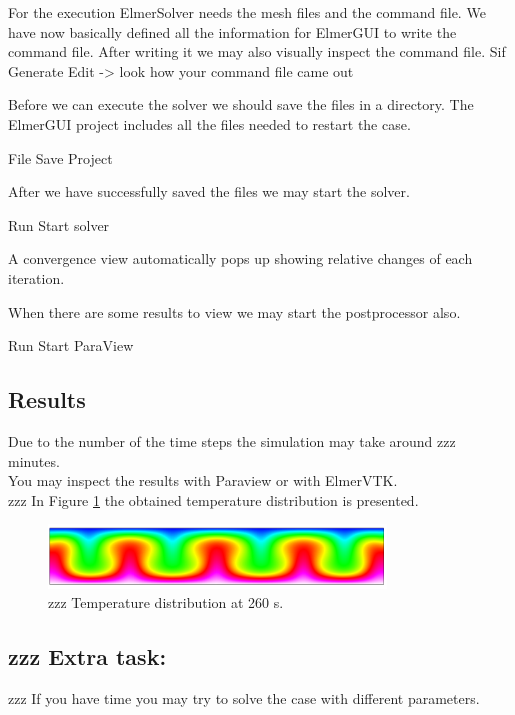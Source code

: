 For the execution ElmerSolver needs the mesh files and the command file.  We have now basically defined all the information for ElmerGUI to write the command file. After writing it we may also visually inspect the command file.
\ttbegin
Sif 
  Generate
  Edit -> look how your command file came out  
\ttend

Before we can execute the solver we should save the files in a directory.  The ElmerGUI project includes all the files needed to restart the case.

\ttbegin
File 
  Save Project
\ttend

After we have successfully saved the files we may start the solver.

\ttbegin
Run
  Start solver
\ttend

A convergence view automatically pops up showing relative changes of each iteration.

When there are some results to view we may start the postprocessor also.

\ttbegin
Run
  Start ParaView
\ttend

\subsection*{Results}

Due to the number of the time steps the simulation may take around zzz minutes.\\

You may inspect the results with Paraview or with ElmerVTK.\\

zzz In Figure \ref{fg:temp} the obtained temperature distribution is presented. 

\begin{figure}[H]
\centering
\includegraphics[width=0.8\textwidth]{temp}
\caption{zzz Temperature distribution at 260 s.}\label{fg:temp}
\end{figure} 

\subsection*{zzz Extra task:}

zzz If you have time you may try to solve the case with different parameters.

\hfill
